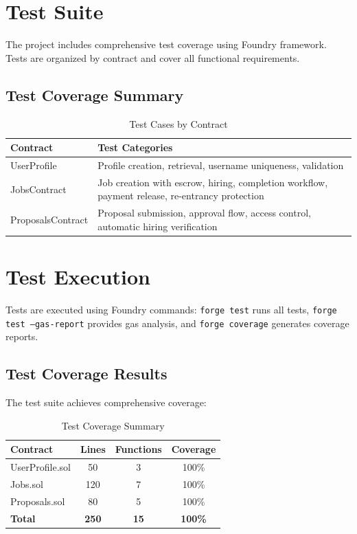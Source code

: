 \section{Test Suite}

The project includes comprehensive test coverage using Foundry framework. Tests are organized by contract and cover all functional requirements.

\subsection{Test Coverage Summary}

\begin{table}[H]
\centering
\caption{Test Cases by Contract}
\begin{tabular}{|l|p{8cm}|}
\hline
\textbf{Contract} & \textbf{Test Categories} \\
\hline
UserProfile & Profile creation, retrieval, username uniqueness, validation \\
\hline
JobsContract & Job creation with escrow, hiring, completion workflow, payment release, re-entrancy protection \\
\hline
ProposalsContract & Proposal submission, approval flow, access control, automatic hiring verification \\
\hline
\end{tabular}
\end{table}

\section{Test Execution}

Tests are executed using Foundry commands: \texttt{forge test} runs all tests, \texttt{forge test --gas-report} provides gas analysis, and \texttt{forge coverage} generates coverage reports.

\subsection{Test Coverage Results}

The test suite achieves comprehensive coverage:

\begin{table}[H]
\centering
\caption{Test Coverage Summary}
\begin{tabular}{|l|c|c|c|}
\hline
\textbf{Contract} & \textbf{Lines} & \textbf{Functions} & \textbf{Coverage} \\
\hline
UserProfile.sol & 50 & 3 & 100\% \\
\hline
Jobs.sol & 120 & 7 & 100\% \\
\hline
Proposals.sol & 80 & 5 & 100\% \\
\hline
\textbf{Total} & \textbf{250} & \textbf{15} & \textbf{100\%} \\
\hline
\end{tabular}
\end{table}

